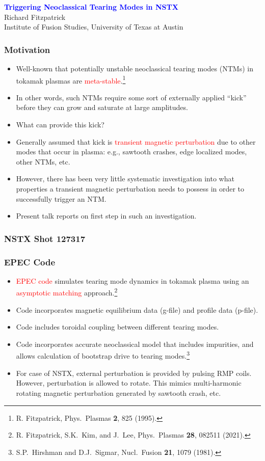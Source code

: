 \documentclass{beamer}
\newcommand{\blue}[1]{\textcolor{blue}{#1}}
\newcommand{\red}[1]{\textcolor{red}{#1}}
\begin{document}
\begin{frame}
\begin{center}
\blue{\Large\bf Triggering Neoclassical Tearing Modes in NSTX}\\[2ex]
Richard Fitzpatrick\\[0.5ex]
Institute of Fusion Studies, University of Texas at Austin
\end{center}


\end{frame}

\begin{frame}
\frametitle{Motivation}
 
\begin{itemize}
\item Well-known that potentially unstable neoclassical tearing modes (NTMs) in tokamak plasmas are \red{meta-stable}.\footnote{R. Fitzpatrick, 
Phys.\ Plasmas {\bf 2}, 825 (1995).}
\item In other words, such NTMs require some sort of externally applied ``kick'' before they can grow and saturate at large amplitudes.
\item What can provide this kick? 
\item Generally assumed that kick is \red{transient magnetic perturbation} due to other modes that occur in plasma: e.g., sawtooth crashes, edge localized modes, other NTMs, etc.
\item However, there has been very little systematic investigation into what properties a transient magnetic
perturbation needs to possess in order to successfully trigger an NTM. 
\item Present talk reports on first step in such an investigation. 
\end{itemize}
\end{frame}

\begin{frame}
\frametitle{NSTX Shot 127317}
\frametitle{EPEC Code}
 
\begin{itemize}
\item \red{EPEC code} simulates tearing mode dynamics in tokamak plasma using an \red{asymptotic matching} approach.\footnote{R. Fitzpatrick, S.K.~Kim, and J.~Lee, Phys.\ Plasmas {\bf 28}, 082511 (2021).}  
\item Code incorporates magnetic equilibrium data (g-file) and profile data (p-file). 
\item Code includes toroidal coupling between different tearing modes. 
\item Code incorporates accurate neoclassical model that includes impurities, and allows calculation of bootstrap
drive to tearing modes.\footnote{S.P.~Hirshman and D.J.~Sigmar, Nucl.\ Fusion {\bf 21}, 1079 (1981).} 
\item For case of NSTX, external perturbation is provided by pulsing RMP coils. However, perturbation is allowed to rotate.
This mimics multi-harmonic rotating magnetic perturbation generated by sawtooth crash, etc.
\end{itemize}
\end{frame}
\end{document}
